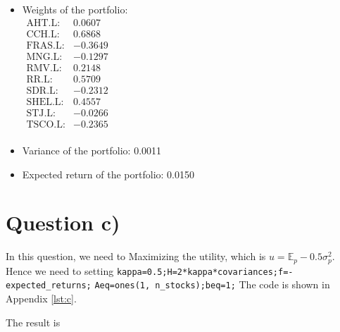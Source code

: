 \documentclass[12pt]{article}
\begin{document}
\begin{itemize}
    \item Weights of the portfolio: \\ \(
          \begin{array}{rr}
              \text{AHT.L:}  & 0.0607  \\
              \text{CCH.L:}  & 0.6868  \\
              \text{FRAS.L:} & -0.3649 \\
              \text{MNG.L:}  & -0.1297 \\
              \text{RMV.L:}  & 0.2148  \\
              \text{RR.L:}   & 0.5709  \\
              \text{SDR.L:}  & -0.2312 \\
              \text{SHEL.L:} & 0.4557  \\
              \text{STJ.L:}  & -0.0266 \\
              \text{TSCO.L:} & -0.2365 \\
          \end{array}
          \)
    \item Variance of the portfolio: 0.0011
    \item Expected return of the portfolio: 0.0150
\end{itemize}

\section{Question c)}

In this question, we need to Maximizing the utility, which is
\(u=\mathbb{E}_p-0.5 \sigma_p^2\).
Hence we need to setting
\verb|kappa=0.5;H=2*kappa*covariances;f=-expected_returns;|
\verb|Aeq=ones(1, n_stocks);beq=1;| The code is shown in Appendix \ref{lst:c}.

The result is
\end{document}
